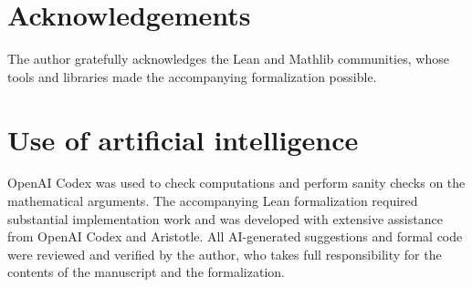 \documentclass[11pt]{article}
\begin{document}
\section*{Acknowledgements}
The author gratefully acknowledges the Lean and Mathlib communities, whose tools and libraries made the accompanying formalization possible.

\section*{Use of artificial intelligence}
OpenAI Codex was used to check computations and perform sanity checks on the mathematical arguments. The accompanying Lean formalization required substantial implementation work and was developed with extensive assistance from OpenAI Codex and Aristotle. All AI-generated suggestions and formal code were reviewed and verified by the author, who takes full responsibility for the contents of the manuscript and the formalization.
\end{document}
